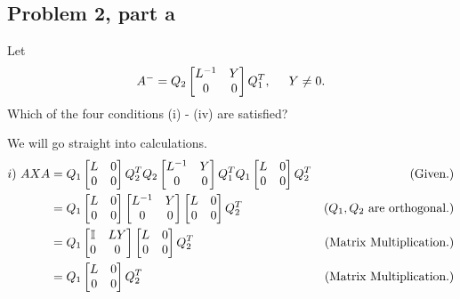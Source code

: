 \subsection{Problem 2, part a}
Let 
\[
A^- = Q_2\begin{bmatrix}L^{-1} &Y \\ 0 &0\end{bmatrix}Q_1^T, \hspace{5mm} Y\neq 0. 
\]
Which of the four conditions (i) - (iv) are satisfied?
\partbreak
\begin{solution}

    We will go straight into calculations.
    \alignbreak
    \begin{align}
        i) \ AXA &=  Q_1 \begin{bmatrix}L &0\\0&0\end{bmatrix}Q_2^T Q_2\begin{bmatrix}L^\inv &Y \\ 0 &0\end{bmatrix}Q_1^T Q_1 \begin{bmatrix}L &0\\0&0\end{bmatrix}Q_2^T &\text{(Given.)}\nonumber\\
        &= Q_1 \begin{bmatrix}L &0\\0&0\end{bmatrix}\begin{bmatrix}L^\inv &Y \\ 0 &0\end{bmatrix}\begin{bmatrix}L &0\\0&0\end{bmatrix}Q_2^T &\text{($Q_1, Q_2$ are orthogonal.)}\nonumber\\
        &=  Q_1 \begin{bmatrix}\id &LY\\0&0\end{bmatrix}\begin{bmatrix}L &0 \\ 0 &0\end{bmatrix}Q_2^T &\text{(Matrix Multiplication.)}\nonumber\\
        &=  Q_1 \begin{bmatrix}L &0 \\ 0 &0\end{bmatrix}Q_2^T &\text{(Matrix Multiplication.)}\nonumber\\

\end{align}
\end{solution}
